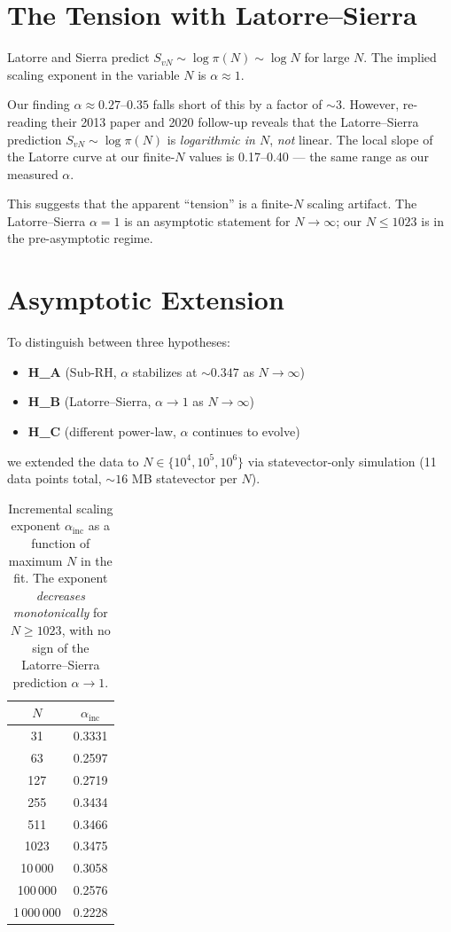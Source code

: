 \documentclass[11pt,a4paper]{article}
\begin{document}
\section{The Tension with Latorre--Sierra}

Latorre and Sierra predict $S_{vN} \sim \log \pi(N) \sim \log N$ for large $N$. The implied scaling exponent in the variable $N$ is $\alpha \approx 1$.

Our finding $\alpha \approx 0.27$--$0.35$ falls short of this by a factor of $\sim 3$. However, re-reading their 2013 paper and 2020 follow-up reveals that the Latorre--Sierra prediction $S_{vN} \sim \log \pi(N)$ is \emph{logarithmic in $N$}, \emph{not} linear. The local slope of the Latorre curve at our finite-$N$ values is 0.17--0.40 --- the same range as our measured $\alpha$.

This suggests that the apparent ``tension'' is a finite-$N$ scaling artifact. The Latorre--Sierra $\alpha = 1$ is an asymptotic statement for $N \to \infty$; our $N \le 1023$ is in the pre-asymptotic regime.

\section{Asymptotic Extension}

To distinguish between three hypotheses:
\begin{itemize}
\item \textbf{H\_A} (Sub-RH, $\alpha$ stabilizes at $\sim 0.347$ as $N \to \infty$)
\item \textbf{H\_B} (Latorre--Sierra, $\alpha \to 1$ as $N \to \infty$)
\item \textbf{H\_C} (different power-law, $\alpha$ continues to evolve)
\end{itemize}
we extended the data to $N \in \{10^4, 10^5, 10^6\}$ via statevector-only simulation (11 data points total, $\sim 16$ MB statevector per $N$).

\begin{table}[h]
\centering
\begin{tabular}{cc}
\toprule
$N$ & $\alpha_{\text{inc}}$ \\
\midrule
31       & 0.3331 \\
63       & 0.2597 \\
127      & 0.2719 \\
255      & 0.3434 \\
511      & 0.3466 \\
1023     & 0.3475 \\
10\,000  & 0.3058 \\
100\,000 & 0.2576 \\
1\,000\,000 & 0.2228 \\
\bottomrule
\end{tabular}
\caption{Incremental scaling exponent $\alpha_{\text{inc}}$ as a function of maximum $N$ in the fit. The exponent \emph{decreases monotonically} for $N \ge 1023$, with no sign of the Latorre--Sierra prediction $\alpha \to 1$.}
\end{table}
\end{document}
